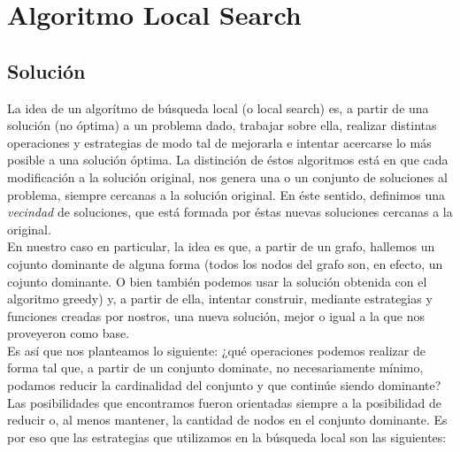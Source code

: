 \section{Algoritmo Local Search}

\subsection{Solución}
La idea de un algorítmo de búsqueda local (o local search) es, a partir de una solución (no óptima) a un problema dado, trabajar sobre ella, realizar distintas operaciones y estrategias de modo tal de mejorarla e intentar acercarse lo más posible a una solución óptima. La distinción de éstos algoritmos está en que cada modificación a la solución original, nos genera una o un conjunto de soluciones al problema, siempre cercanas a la solución original. En éste sentido, definimos una \textit{vecindad} de soluciones, que está formada por éstas nuevas soluciones cercanas a la original. \\
En nuestro caso en particular, la idea es que, a partir de un grafo, hallemos un cojunto dominante de alguna forma (todos los nodos del grafo son, en efecto, un cojunto dominante. O bien también podemos usar la solución obtenida con el algoritmo greedy) y, a partir de ella, intentar construir, mediante estrategias y funciones creadas por nostros, una nueva solución, mejor o igual a la que nos proveyeron como base. \\
Es así que nos planteamos lo siguiente: ¿qué operaciones podemos realizar de forma tal que, a partir de un conjunto dominate, no necesariamente mínimo, podamos reducir la cardinalidad del conjunto y que continúe siendo dominante? Las posibilidades que encontramos fueron orientadas siempre a la posibilidad de reducir o, al menos mantener, la cantidad de nodos en el conjunto dominante. Es por eso que las estrategias que utilizamos en la búsqueda local son las siguientes: 


